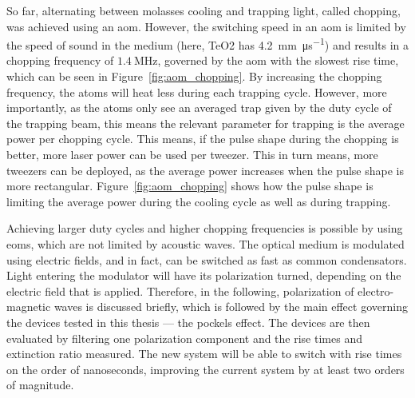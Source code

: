 So far, alternating between molasses cooling and trapping light, called chopping, was achieved using an \ac{aom}. However, the switching speed in an \ac{aom} is limited by the speed of sound in the medium (here, TeO2 has \SI{4.2}{\milli\meter\per\micro\second}) and results in a chopping frequency of $\SI{1.4}{\mega\hertz}$, governed by the \ac{aom} with the slowest rise time, which can be seen in Figure~\ref{fig:aom_chopping}. By increasing the chopping frequency, the atoms will heat less during each trapping cycle. However, more importantly, as the atoms only see an averaged trap given by the duty cycle of the trapping beam, this means the relevant parameter for trapping is the average power per chopping cycle. This means, if the pulse shape during the chopping is better, more laser power can be used per tweezer. This in turn means, more tweezers can be deployed, as the average power increases when the pulse shape is more rectangular. Figure~\ref{fig:aom_chopping} shows how the pulse shape is limiting the average power during the cooling cycle as well as during trapping.

\begin{figure}[t]%
\end{figure}

Achieving larger duty cycles and higher chopping frequencies is possible by using \acp{eom}, which are not limited by acoustic waves. The optical medium is modulated using electric fields, and in fact, can be switched as fast as common condensators. Light entering the modulator will have its polarization turned, depending on the electric field that is applied. Therefore, in the following, polarization of electro-magnetic waves is discussed briefly, which is followed by the main effect governing the devices tested in this thesis --- the pockels effect. The devices are then evaluated by filtering one polarization component and the rise times and extinction ratio measured. The new system will be able to switch with rise times on the order of nanoseconds, improving the current system by at least two orders of magnitude.

